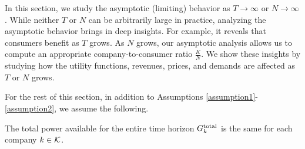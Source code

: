 {\color{black}In this section, we study the asymptotic (limiting) behavior as $T\rightarrow \infty$ or $N\rightarrow \infty$. While neither $T$ or $N$ can be arbitrarily large in practice, analyzing the asymptotic behavior brings in deep insights. For example, it reveals that consumers benefit as $T$ grows. As $N$ grows, our asymptotic analysis allows us to compute an appropriate company-to-consumer ratio $\frac{K}{N}$. We show these insights by studying how the utility functions, revenues, prices, and demands are affected as $T$ or $N$ grows. {For the rest of this section, in addition to Assumptions \ref{assumption1}-\ref{assumption2}, we assume the following. 
\begin{assumption} 
The total power available for the entire time horizon $G_k^{{\rm total}}$ is the same for each company $k\in{\cal K}$.
\label{assumption3}
\end{assumption}
}}
